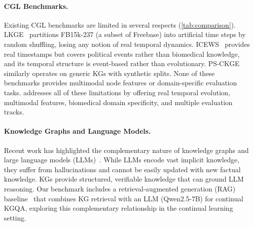 \paragraph{CGL Benchmarks.}
Existing CGL benchmarks are limited in several respects (\cref{tab:comparison}).
LKGE~\citep{Cui2023} partitions FB15k-237 (a subset of Freebase) into artificial time steps by random shuffling, losing any notion of real temporal dynamics.
ICEWS~\citep{GarciaDuran2018} provides real timestamps but covers political events rather than biomedical knowledge, and its temporal structure is event-based rather than evolutionary.
PS-CKGE~\citep{Wu2024} similarly operates on generic KGs with synthetic splits.
None of these benchmarks provides multimodal node features or domain-specific evaluation tasks.
\ours addresses all of these limitations by offering real temporal evolution, multimodal features, biomedical domain specificity, and multiple evaluation tracks.

\paragraph{Knowledge Graphs and Language Models.}
Recent work has highlighted the complementary nature of knowledge graphs and large language models (LLMs)~\citep{Pan2024}.
While LLMs encode vast implicit knowledge, they suffer from hallucinations and cannot be easily updated with new factual knowledge.
KGs provide structured, verifiable knowledge that can ground LLM reasoning.
Our benchmark includes a retrieval-augmented generation (RAG) baseline~\citep{Lewis2020} that combines KG retrieval with an LLM (Qwen2.5-7B) for continual KGQA, exploring this complementary relationship in the continual learning setting.
